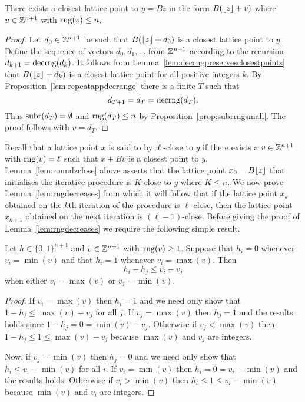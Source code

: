 \documentclass[final,leqno]{siamltex}
\begin{document}
\begin{lemma}\label{lem:roundzclose}
There exists a closest lattice point to $y = Bz$ in the form $B({\left\lfloor z \right\rfloor} + v)$ where $v \in {\mathbb Z}^{n+1}$ with $\operatorname{rng}(v) \leq n$.
\end{lemma}
\begin{proof}
Let $d_0 \in {\mathbb Z}^{n+1}$ be such that $B({\left\lfloor z \right\rfloor} + d_0)$ is a closest lattice point to $y$. Define the sequence of vectors $d_0,d_1,\dots$ from ${\mathbb Z}^{n+1}$ according to the recursion $d_{k+1} = \operatorname{decrng}(d_k)$.  It follows from Lemma~\ref{lem:decrngpreservesclosestpoints} that $B({\left\lfloor z \right\rfloor} + d_{k})$ is a closest lattice point for all positive integers $k$.  By Proposition~\ref{lem:repeatappdecrange} there is a finite $T$ such that 
\[
d_{T+1}=d_T=\operatorname{decrng}(d_T).
\]  
Thus $\operatorname{subr}(d_T) = \emptyset$ and $\operatorname{rng}(d_T) \leq n$ by Proposition~\ref{prop:subrrngsmall}.  The proof follows with $v = d_T$.   
\end{proof}


Recall that a lattice point $x$ is said to by $\ell$-close to $y$ if there exists a $v \in {\mathbb Z}^{n+1}$ with $\operatorname{rng}(v) = \ell$ such that $x + Bv$ is a closest point to $y$.  Lemma~\ref{lem:roundzclose} above asserts that the lattice point $x_0 = B{\left\lfloor z \right\rfloor}$ that initialises the iterative procedure is $K$-close to $y$ where $K \leq n$.  We now prove Lemma~\ref{lem:rngdecreases} from which it will follow that if the lattice point $x_k$ obtained on the $k$th iteration of the procedure is $\ell$-close, then the lattice point $x_{k+1}$ obtained on the next iteration is $(\ell-1)$-close.  Before giving the proof of Lemma~\ref{lem:rngdecreases} we require the following simple result.

\begin{lemma}\label{eq:integergreaterless}
Let $h \in \{0,1\}^{n+1}$ and $v \in {\mathbb Z}^{n+1}$ with $\operatorname{rng}(v) \geq 1$.  Suppose that
$h_i = 0$ whenever $v_i = \min(v)$ and that $h_i = 1$ whenever $v_i = \max(v)$.  Then
\[
h_i - h_j \leq v_i - v_j
\]
when either $v_i = \max(v)$ or $v_j = \min(v)$.
\end{lemma}
\begin{proof}
If $v_i = \max(v)$ then $h_i = 1$ and we need only show that $1-h_j \leq \max(v) - v_j$ for all $j$.  If $v_j = \max(v)$ then $h_j = 1$ and the results holds since $1 - h_j = 0 = \min(v) - v_j$.  Otherwise if $v_j < \max(v)$ then $1-h_j \leq 1 \leq \max(v) - v_j$ because $\max(v)$ and $v_j$ are integers.

Now, if $v_j = \min(v)$ then $h_j = 0$ and we need only show that $h_i \leq v_i - \min(v)$ for all $i$.  If $v_i = \min(v)$ then $h_i = 0 = v_i - \min(v)$ and the results holds.  Otherwise if $v_i > \min(v)$ then $h_i \leq 1 \leq v_i - \min(v)$ because $\min(v)$ and $v_i$ are integers.
\end{proof}
\end{document}
